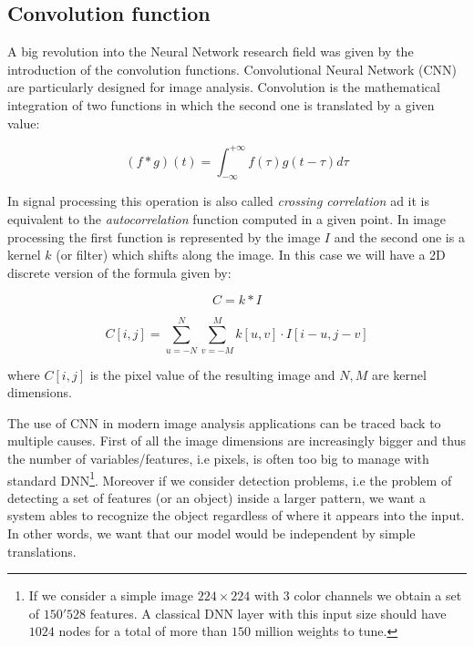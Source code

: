 \documentclass{standalone}
\begin{document}

\subsection[Convolution function]{Convolution function}\label{NN:convolutional}

A big revolution into the Neural Network research field was given by the introduction of the convolution functions.
Convolutional Neural Network (CNN) are particularly designed for image analysis.
Convolution is the mathematical integration of two functions in which the second one is translated by a given value:

$$
(f * g)(t) = \int_{-\infty}^{+\infty} f(\tau)g(t - \tau)d\tau
$$


In signal processing this operation is also called \emph{crossing correlation} ad it is equivalent to the \emph{autocorrelation} function computed in a given point.
In image processing the first function is represented by the image $I$ and the second one is a kernel $k$ (or filter) which shifts along the image.
In this case we will have a 2D discrete version of the formula given by:

$$
C = k * I
$$

$$
C[i, j] = \sum_{u=-N}^{N} \sum_{v=-M}^{M} k[u, v] \cdot I[i - u, j - v]
$$

where $C[i, j]$ is the pixel value of the resulting image and $N, M$ are kernel dimensions.

The use of CNN in modern image analysis applications can be traced back to multiple causes.
First of all the image dimensions are increasingly bigger and thus the number of variables/features, i.e pixels, is often too big to manage with standard DNN\footnote{
  If we consider a simple image $224\times224$ with $3$ color channels we obtain a set of $150'528$ features.
  A classical DNN layer with this input size should have $1024$ nodes for a total of more than $150$ million weights to tune.
}.
Moreover if we consider detection problems, i.e the problem of detecting a set of features (or an object) inside a larger pattern, we want a system ables to recognize the object regardless of where it appears into the input.
In other words, we want that our model would be independent by simple translations.
\end{document}
